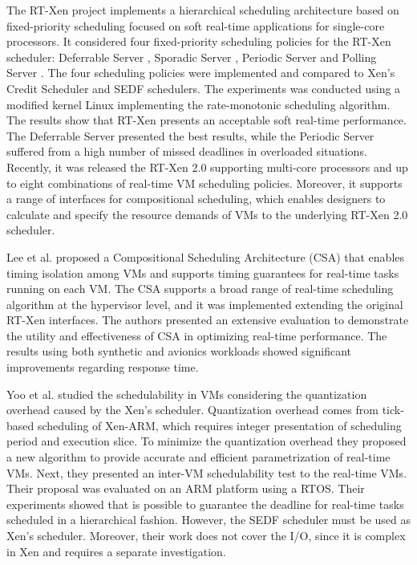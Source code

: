 The RT-Xen project \cite{sisu2011} implements a hierarchical scheduling architecture based on fixed-priority scheduling focused on soft real-time applications for single-core processors. It considered four fixed-priority scheduling policies for the RT-Xen scheduler: Deferrable Server \cite{strosnider1995}, Sporadic Server \cite{sprunt1989}, Periodic Server and Polling Server \cite{sha:1986}. The four scheduling policies were implemented and compared to Xen's Credit Scheduler and SEDF schedulers. The experiments was conducted using a modified kernel Linux implementing the rate-monotonic scheduling algorithm. The results show that RT-Xen presents an acceptable soft real-time performance. The Deferrable Server presented the best results, while the Periodic Server suffered from a high number of missed deadlines in overloaded situations. Recently, it was released the RT-Xen 2.0 \cite{sisu2014} supporting multi-core processors and up to eight combinations of real-time VM scheduling policies. Moreover, it supports a range of interfaces for compositional scheduling, which enables designers to calculate and specify the resource demands of VMs to the underlying RT-Xen 2.0 scheduler. 

Lee et al. \cite{Lee2012} proposed a Compositional Scheduling Architecture (CSA) that enables timing isolation among VMs and supports timing guarantees for real-time tasks running on each VM. The CSA supports a broad range of real-time scheduling algorithm at the hypervisor level, and it was implemented extending the original RT-Xen interfaces. The authors presented an extensive evaluation to demonstrate the utility and effectiveness of CSA in optimizing real-time performance. The results using both synthetic and avionics workloads showed significant improvements regarding response time.

Yoo et al. \cite{seehwan2014} studied the schedulability in VMs considering the quantization overhead caused by the Xen's scheduler. Quantization overhead comes from tick-based scheduling of Xen-ARM, which requires integer presentation of scheduling period and execution slice. To minimize the quantization overhead they proposed a new algorithm to provide accurate and efficient parametrization of real-time VMs. Next, they presented an inter-VM schedulability test to the real-time VMs. Their proposal was evaluated on an ARM platform using a RTOS. Their experiments showed that is possible to guarantee the deadline for real-time tasks scheduled in a hierarchical fashion. However, the SEDF scheduler must be used as Xen's scheduler. Moreover, their work does not cover the I/O, since it is complex in Xen and requires a separate investigation. 

